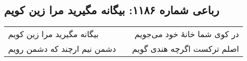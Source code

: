 \begin{center}
\section*{رباعی شماره ۱۱۸۶: بیگانه مگیرید مرا زین کویم}
\label{sec:1186}
\begin{longtable}{l p{0.5cm} r}
بیگانه مگیرید مرا زین کویم
&&
در کوی شما خانهٔ خود می‌جویم
\\
دشمن نیم ارچند که دشمن رویم
&&
اصلم ترکست اگرچه هندی گویم
\\
\end{longtable}
\end{center}

